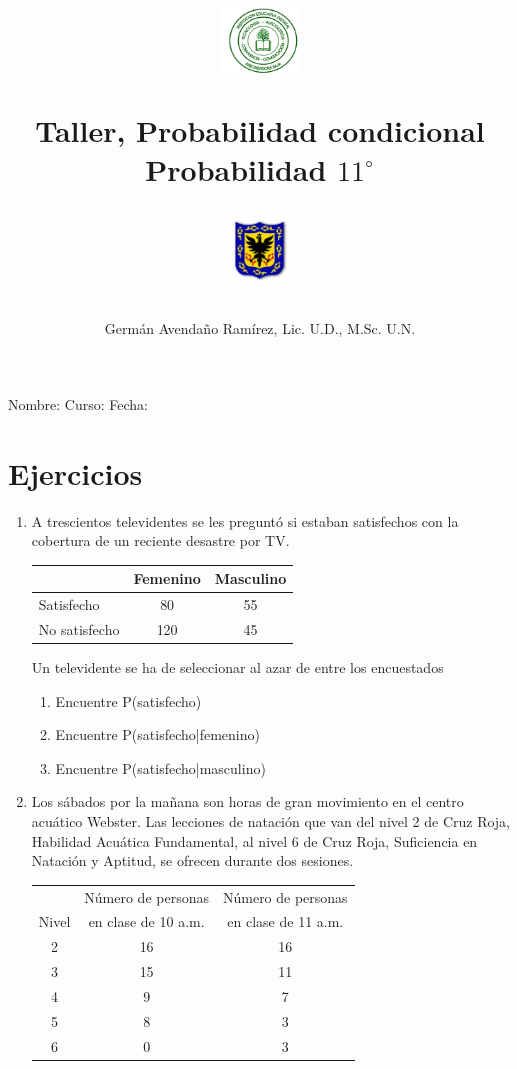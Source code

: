 \documentclass[10pt,twoside]{article}
\author{Germ\'an Avenda\~no Ram\'irez, Lic. U.D., M.Sc. U.N.}
\title{\begin{minipage}{.2\textwidth}
\includegraphics[height=1.75cm]{Images/logo-colegio.png}\end{minipage}
\begin{minipage}{.55\textwidth}
\begin{center}
Taller, Probabilidad condicional  \\
Probabilidad $11^{\circ}$
\end{center}
\end{minipage}\hfill
\begin{minipage}{.2\textwidth}
\includegraphics[height=1.75cm]{Images/logo-sed.png} 
\end{minipage}}
\date{}
\begin{document}
\maketitle
Nombre: \hrulefill Curso: \underline{\hspace*{44pt}} Fecha: \underline{\hspace*{2.5cm}}

\section*{Ejercicios}
\begin{enumerate}
\item A trescientos televidentes se les preguntó si estaban satisfechos con la cobertura de un reciente desastre por TV.
\begin{center}
\begin{tabular}{lcc}
 & Femenino & Masculino \\ 
\hline 
Satisfecho & 80 & 55 \\ 
\hline 
No satisfecho & 120 & 45 \\ 
\hline 
\end{tabular} 
\end{center}
Un televidente se ha de seleccionar al azar de entre los encuestados
\begin{enumerate}
\item Encuentre P(satisfecho)
\item Encuentre P(satisfecho|femenino)
\item Encuentre P(satisfecho|masculino)
\end{enumerate}
\item Los sábados por la mañana son horas de gran
movimiento en el centro acuático Webster. Las lecciones de natación que van del nivel 2 de Cruz Roja, Habilidad Acuática Fundamental, al nivel 6 de Cruz Roja, Suficiencia en Natación y Aptitud, se ofrecen durante dos sesiones.
\begin{center}
\begin{tabular}{ccc}
 & Número de personas & Número de personas \\
Nivel  & en clase de 10 a.m. & en clase de 11 a.m. \\  \hline
2 & 16 & 16 \\ 
3 & 15 & 11 \\ 
4 & 9 & 7 \\ 
5 & 8 & 3 \\ 
6 & 0 & 3 \\ 
\hline 
\end{tabular} 

\end{center}
\end{enumerate}
\end{document}
